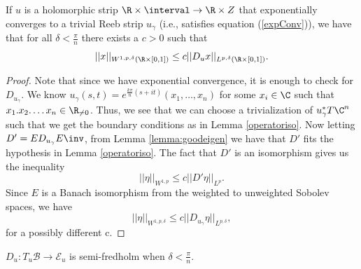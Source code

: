 \begin{cor}
\label{corr:localcylestimate}
If $u$ is a holomorphic strip $\R \times \interval \to \R \times Z$ that exponentially converges to a trivial Reeb strip $u_\gamma$  (i.e., satisfies equation (\ref{expConv})), we have that for all $ \delta< \frac{\pi}{n}$ there exists a $c>0$ such that $$||x||_{W^{1,p,\delta}(\R \times [0,1])}\leq c||D_ux||_{L^{p,\delta}(\R \times [0,1])}.$$
\end{cor}

\begin{proof}
Note that since we have exponential convergence, it is enough to check for $D_{u_\gamma}$. We know $u_\gamma(s,t) = e^{\frac{k\pi}{n}(s+it)}(x_1,\dots,x_n)$ for some $x_i \in \C$ such that $x_1.x_2.\dots x_n \in \R_{\neq 0}$. Thus, we see that we can choose a trivialization of $u_\gamma ^* T\C^n$ such that we get the boundary conditions as in Lemma \ref{operatoriso}. Now letting $D'=ED_{u_\gamma}E\inv$, from Lemma \ref{lemma:goodeigen} we have that $D'$ fits the hypothesis in Lemma \ref{operatoriso}. The fact that $D'$ is an isomorphism gives us the inequality 
$$||\eta ||_{W^{1,p}} \leq c || D' \eta ||_{L^p}. $$
Since $E$ is a Banach isomorphism from the weighted to unweighted Sobolev spaces, we have 
$$ ||\eta ||_{W^{1,p,\delta}} \leq c || D_{u_\gamma} \eta ||_{L^{p,\delta}}, $$ for a possibly different c.
\end{proof}


\begin{Theorem}
$D_{u}: T_u\mathcal{B} \to \mathcal{E}_u $ is semi-fredholm when $ \delta < \frac{\pi}{n}$.
\end{Theorem}

